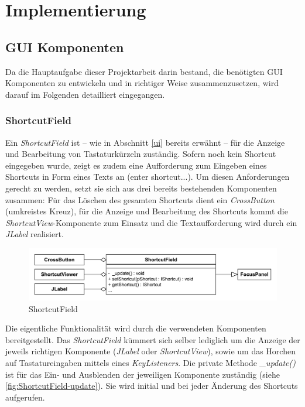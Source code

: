 \section{Implementierung}

\subsection{GUI Komponenten}

Da die Hauptaufgabe dieser Projektarbeit darin bestand, die benötigten GUI Komponenten zu entwickeln und in richtiger Weise zusammenzusetzen, wird darauf im Folgenden detailliert eingegangen.

\subsubsection{ShortcutField}

Ein \emph{ShortcutField} ist -- wie in Abschnitt \ref{ui} bereits erwähnt -- für die Anzeige und Bearbeitung von Tastaturkürzeln zuständig. Sofern noch kein Shortcut eingegeben wurde, zeigt es zudem eine Aufforderung zum Eingeben eines Shortcuts in Form eines Texts an (\glqq enter shortcut...\grqq). Um diesen Anforderungen gerecht zu werden, setzt sie sich aus drei bereits bestehenden Komponenten zusammen: Für das Löschen des gesamten Shortcuts dient ein \emph{CrossButton} (umkreistes Kreuz), für die Anzeige und Bearbeitung des Shortcuts kommt die \emph{ShortcutView}-Komponente zum Einsatz und die Textaufforderung wird durch ein \emph{JLabel} realisiert.

\begin{figure}[H]
	\centering
	\includegraphics[width=0.8\linewidth]{../graphic/diagrams/CD_ShortcutField/ShortcutField}
	\caption{ShortcutField}
	\label{fig:shortcutfield}
\end{figure}

Die eigentliche Funktionalität wird durch die verwendeten Komponenten bereitgestellt. Das \emph{ShortcutField} kümmert sich selber lediglich um die Anzeige der jeweils richtigen Komponente (\emph{JLabel} oder \emph{ShortcutView}), sowie um das Horchen auf Tastatureingaben mittels eines \emph{KeyListeners}. Die private Methode \emph{\_update()} ist für das Ein- und Ausblenden der jeweiligen Komponente zuständig (siehe \autoref{fig:ShortcutField-update}). Sie wird initial und bei jeder Änderung des Shortcuts aufgerufen.

